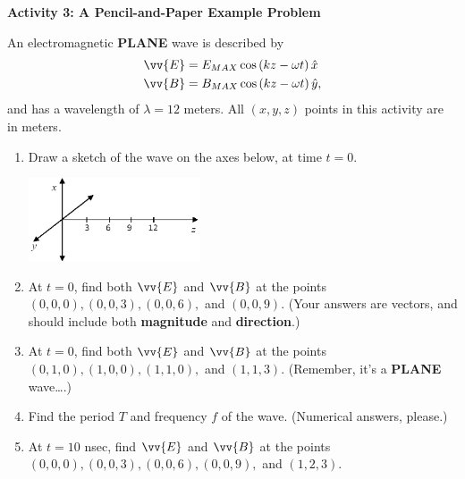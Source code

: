 \textbf{Activity 3: A Pencil-and-Paper Example Problem}

An electromagnetic \textbf{PLANE} wave is described by
\begin{align*}
\vv {E} &= E_{MAX} \cos \left ( kz - \omega t \right ) \hat x\\
\vv {B} &= B_{MAX} \cos \left ( kz - \omega t \right ) \hat y,
\end{align*}
and has a wavelength of $\lambda =12$ meters.  All $(x,y,z)$ points in this activity are in meters.
\vspace{0.1in}

\begin{enumerate}

\item Draw a sketch of the wave on the axes below, at time $t=0$.
\begin{center}
\includegraphics[width=0.4\textwidth]{plane_waves/em_waves_axes.eps}
\end{center}

\item At $t=0$, find both $\vv {E}$ and $\vv {B}$ at the points $(0,0,0), (0,0,3), (0,0,6),$ and $(0,0,9)$.  (Your answers are vectors, and should include both \textbf{magnitude} and \textbf{direction}.) 
\vspace{1.0in}

\item At $t=0$, find both $\vv {E}$ and $\vv {B}$ at the points $(0,1,0), (1,0,0), (1,1,0),$ and $(1,1,3)$.  (Remember, it's a \textbf{PLANE} wave….)
\vspace{1.0in}

\item Find the period $T$ and frequency $f$ of the wave.  (Numerical answers, please.)
\vspace{1.0in}

\item At $t=10$ nsec, find $\vv {E}$ and $\vv {B}$ at the points $(0,0,0), (0,0,3), (0,0,6), (0,0,9),$ and $(1,2,3)$.  
\vspace{1.0in}
\end{enumerate}



